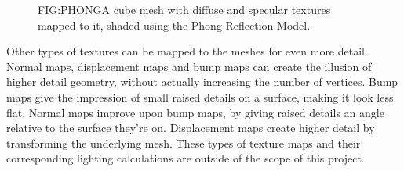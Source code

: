 
\begin{figure}[Phong lighting with texture mapping]{FIG:PHONG}{A cube mesh with diffuse and specular textures mapped to it, shaded using the Phong Reflection Model.}
\end{figure}

Other types of textures can be mapped to the meshes for even more detail.
Normal maps,
displacement maps and bump maps can create the illusion of higher detail geometry,
without actually increasing the number of vertices.
Bump maps give the impression of small raised details on a surface,
making it look less flat.
Normal maps improve upon bump maps,
by giving raised details an angle relative to the surface they're on.
Displacement maps create higher detail by transforming the underlying mesh.
These types of texture maps and their corresponding lighting calculations are outside of the scope of this project.
